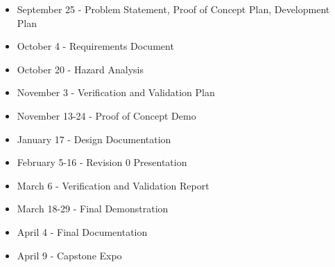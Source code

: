 \documentclass{article}
\begin{document}
\begin{itemize}
\item September 25 - Problem Statement, Proof of Concept Plan, Development Plan
\item October 4 - Requirements Document
\item October 20 - Hazard Analysis
\item November 3 - Verification and Validation Plan
\item November 13-24 - Proof of Concept Demo
\item January 17 - Design Documentation
\item February 5-16 - Revision 0 Presentation
\item March 6 - Verification and Validation Report
\item March 18-29 - Final Demonstration
\item April 4 - Final Documentation
\item April 9 - Capstone Expo
\end {itemize}
\end{document}

